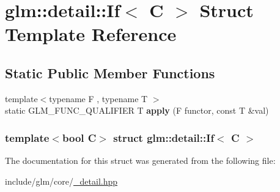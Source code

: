 \hypertarget{structglm_1_1detail_1_1If}{\section{glm\-:\-:detail\-:\-:\-If$<$ \-C $>$ \-Struct \-Template \-Reference}
\label{structglm_1_1detail_1_1If}
}
\subsection*{\-Static \-Public \-Member \-Functions}
\begin{DoxyCompactItemize}
\item 
\hypertarget{structglm_1_1detail_1_1If_ab66c77bac87f7ffe4aa6bb761b165746}{{\footnotesize template$<$typename F , typename T $>$ }\\static \-G\-L\-M\-\_\-\-F\-U\-N\-C\-\_\-\-Q\-U\-A\-L\-I\-F\-I\-E\-R \-T {\bfseries apply} (\-F functor, const \-T \&val)}\label{structglm_1_1detail_1_1If_ab66c77bac87f7ffe4aa6bb761b165746}

\end{DoxyCompactItemize}
\subsubsection*{template$<$bool \-C$>$ struct glm\-::detail\-::\-If$<$ C $>$}



\-The documentation for this struct was generated from the following file\-:\begin{DoxyCompactItemize}
\item 
include/glm/core/\hyperlink{__detail_8hpp}{\-\_\-detail.\-hpp}\end{DoxyCompactItemize}
